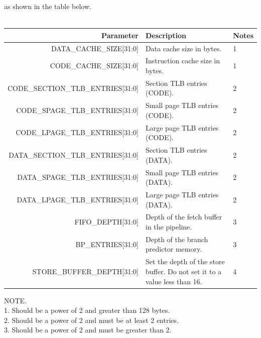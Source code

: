 \documentclass[10pt]{article}
\begin{document}
as shown in the table below.
\\
\\
\begin{tabularx}{\linewidth}{|r|X|X|}
\hline
Parameter &
Description &
Notes \\ \hline

DATA\_CACHE\_SIZE[31:0] &
Data cache size in bytes. &
1 \\ \hline

CODE\_CACHE\_SIZE[31:0] &
Instruction cache size in bytes. &
1 \\ \hline

CODE\_SECTION\_TLB\_ENTRIES[31:0] &
Section TLB entries (CODE). &
2 \\ \hline

CODE\_SPAGE\_TLB\_ENTRIES[31:0] &
Small page TLB entries (CODE). &
2 \\ \hline

CODE\_LPAGE\_TLB\_ENTRIES[31:0] &
Large page TLB entries (CODE). &
2 \\ \hline

DATA\_SECTION\_TLB\_ENTRIES[31:0] &
Section TLB entries (DATA). &
2 \\ \hline

DATA\_SPAGE\_TLB\_ENTRIES[31:0] &
Small page TLB entries (DATA). &
2 \\ \hline

DATA\_LPAGE\_TLB\_ENTRIES[31:0] &
Large page TLB entries (DATA). &
2 \\ \hline

FIFO\_DEPTH[31:0] &
Depth of the fetch buffer in the pipeline. &
3 \\ \hline

BP\_ENTRIES[31:0] &
Depth of the branch predictor memory. &
3 \\ \hline

STORE\_BUFFER\_DEPTH[31:0] &
Set the depth of the store buffer. Do not set it to a value less than 16. &
4  \\ \hline
\end{tabularx}

NOTE. \\

1. Should be a power of 2 and greater than 128 bytes. \\

2. Should be a power of 2 and must be at least 2 entries. \\
 
3. Should be a power of 2 and must be greater than 2. \\
\end{document}
